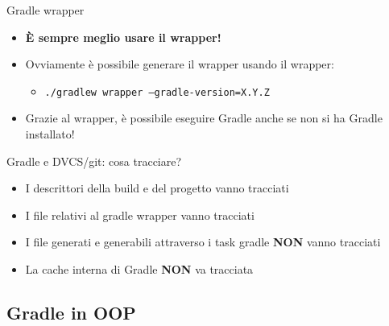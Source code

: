 \documentclass[xcolor=dvipsnames,presentation]{beamer}
\begin{document}
\begin{frame}[allowframebreaks]{Gradle wrapper}
\begin{itemize}
        \begin{itemize}
            \item \texttt{./gradlew nomeTask} --- su Unix o emulatore bash come git bash
            \item \texttt{gradlew.bat nomeTask} --- su Windows cmd o Powershell
        \end{itemize}
        \item \textbf{È sempre meglio usare il wrapper!}
        \item Ovviamente è possibile generare il wrapper usando il wrapper:
        \begin{itemize}
            \item \texttt{./gradlew wrapper --gradle-version=X.Y.Z}
        \end{itemize}
        \item Grazie al wrapper, è possibile eseguire Gradle anche se non si ha Gradle installato!
    \end{itemize}
\end{frame}

\begin{frame}{Gradle e DVCS/git: cosa tracciare?}

\begin{itemize}
\item I descrittori della build e del progetto vanno tracciati
\item I file relativi al gradle wrapper vanno tracciati
\item I file generati e generabili attraverso i task gradle \textbf{NON} vanno tracciati
\item La cache interna di Gradle \textbf{NON} va tracciata
\end{itemize}

\end{frame}

\subsection{Gradle in OOP}
\end{document}
